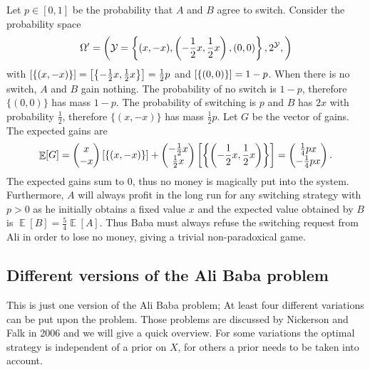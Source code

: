\documentclass[a4paper]{report}
\theoremstyle{plain}
\theoremstyle{definition}
\theoremstyle{remark}
\numberwithin{equation}{chapter}
\let\P\relax
\DeclareMathOperator{\P}{\mathbb{P}}
\DeclareMathOperator{\E}{\mathbb{E}}
\DeclareMathOperator{\1}{\mathbbm{1}}
\newcommand{\Y}{\mathcal{Y}}
\begin{document}
Let $p\in[0,1]$ be the probability that $A$ and $B$ agree to switch. Consider the probability space
\begin{equation}
\Omega'=\left(\Y=\left\{(x,-x),\left(-\frac{1}{2}x,\frac{1}{2}x\right),(0,0)\right\},2^\Y,\P\right)
\end{equation}
with $\P[\{(x,-x)\}]=\P\left[\left\{-\frac{1}{2}x,\frac{1}{2}x\right\}\right]=\frac{1}{2}p$ and $\P[\{(0,0)\}]=1-p$. When there is no switch, $A$ and $B$ gain nothing. The probability of no switch is $1-p$, therefore $\{(0,0)\}$ has mass $1-p$. The probability of switching is $p$ and $B$ has $2x$ with probability $\frac{1}{2}$, therefore $\{(x,-x)\}$ has mass $\frac{1}{2}p$. Let $G$ be the vector of gains. The expected gains are
\begin{align}
\E[G]=\begin{pmatrix}x\\-x\end{pmatrix}\P[\{(x,-x)\}]+\begin{pmatrix}-\frac{1}{2}x\\\frac{1}{2}x\end{pmatrix}\P\left[\left\{\left(-\frac{1}{2}x,\frac{1}{2}x\right)\right\}\right]=\begin{pmatrix}\frac{1}{4}px\\-\frac{1}{4}px\end{pmatrix}.
\end{align}
The expected gains sum to $0$, thus no money is magically put into the system. Furthermore, $A$ will always profit in the long run for any switching strategy with $p>0$ as he initially obtains a fixed value $x$ and the expected value obtained by $B$ is $\E[B]=\frac{5}{4}\E[A]$. Thus Baba must always refuse the switching request from Ali in order to lose no money, giving a trivial non-paradoxical game.

\subsection{Different versions of the Ali Baba problem}
This is just one version of the Ali Baba problem; At least four different variations can be put upon the problem. Those problems are discussed by Nickerson and Falk in 2006 \cite{Nickerson06} and we will give a quick overview. For some variations the optimal strategy is independent of a prior on $X$, for others a prior needs to be taken into account.
\end{document}
